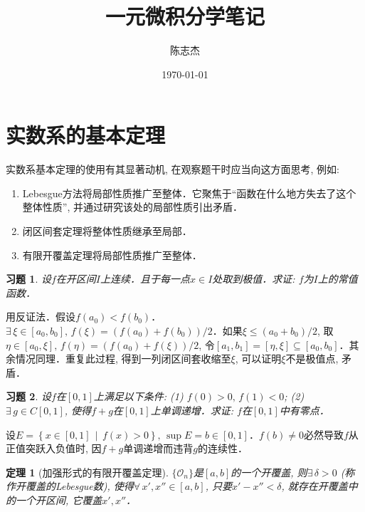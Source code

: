 \documentclass[11pt,a4paper]{ctexart}
\title{一元微积分学笔记}
\author{陈志杰}
\date{\today}
\makeatletter
\theoremstyle{thmseries} %
\newtheorem{thm}{定理}[section]
\theoremstyle{exerseries}
\newtheorem{exer}{习题}[section]
\renewenvironment{proof}[1][\proofname]{\par
  \pushQED{\qed}%
  \normalfont \topsep6\p@\@plus6\p@\relax
  \trivlist
  \item[\hskip\labelsep
        \itshape
    #1\@addpunct{}]\ignorespaces
}{%
  \popQED\endtrivlist\@endpefalse
}
\newenvironment{pf}{\begin{proof}[\bfseries\upshape 证\quad]}{\end{proof}}
\newcommand{\cbra}[1]{\mathopen{}\left\{#1\right\}}
\makeatother
\begin{document}
\maketitle
\thispagestyle{empty}
\tableofcontents
\justifying
\newpage


\section{实数系的基本定理}
实数系基本定理的使用有其显著动机, 在观察题干时应当向这方面思考, 例如:
\begin{enumerate}
	\item Lebesgue方法将局部性质推广至整体．它聚焦于``函数在什么地方失去了这个整体性质'', 并通过研究该处的局部性质引出矛盾．
	\item 闭区间套定理将整体性质继承至局部．
	\item 有限开覆盖定理将局部性质推广至整体．
\end{enumerate}

\begin{exer}
	设$f$在开区间$I$上连续．且于每一点$x\in I$处取到极值．求证: $f$为$I$上的常值函数．
\end{exer}
\begin{pf}
	用反证法．假设$f(a_0)<f(b_0)$．$\exists\,\xi\in[a_0,b_0],\,f(\xi)=(f(a_0)+f(b_0))/2$．如果$\xi\leq(a_0+b_0)/2$, 取$\eta\in[a_0,\xi],\,f(\eta)=(f(a_0)+f(\xi))/2$, 令$[a_1,b_1]=[\eta,\xi]\subseteq[a_0,b_0]$．其余情况同理．重复此过程, 得到一列闭区间套收缩至$\xi$, 可以证明$\xi$不是极值点, 矛盾．
\end{pf}

\begin{exer}
	设$f$在$[0,1]$上满足以下条件: (1) $f(0)>0,\,f(1)<0$; (2) $\exists\,g\in C[0,1]$, 使得$f+g$在$[0,1]$上单调递增．求证: $f$在$[0,1]$中有零点．
\end{exer}
\begin{pf}
	设$E=\cbra{x\in[0,1]\,\middle\vert\,f(x)>0},\,\sup E=b\in[0,1]$．$f(b)\neq0$必然导致$f$从正值突跃入负值时, 因$f+g$单调递增而违背$g$的连续性．
\end{pf}

\begin{thm}[加强形式的有限开覆盖定理]
	$\{\mathcal{O}_n\}$是$[a,b]$的一个开覆盖, 则$\exists\,\delta>0$ (称作开覆盖的Lebesgue数), 使得$\forall\,x',x''\in[a,b]$, 只要$x'-x''<\delta$, 就存在开覆盖中的一个开区间, 它覆盖$x',x''$．
\end{thm}
\end{document}
